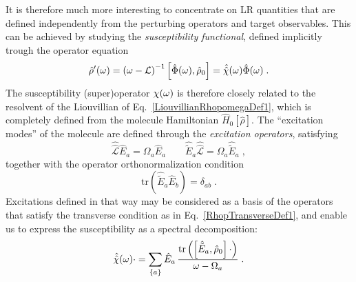 \documentclass[reprint,aps,prb]{revtex4-1}
\newcommand{\be}{\begin{equation}}
\newcommand{\ee}{\end{equation}}
\newcommand{\qq}{\qquad}
\newcommand{\lb}{\label}
\newcommand{\op}[1]{\hat {#1}}
\newcommand{\sop}[1]{\op{\op {#1}}}
\newcommand{\commutator}[2]{\left[ {#1} , {#2} \right]}
\newcommand{\trace}[1]{\mathrm{tr}\left(#1\right)}
\newcommand{\dmnot}{\op{\rho}_0}
\newcommand{\dm}{\op{\rho}}
\newcommand{\hnot}{\op{H}_0}
\newcommand{\Liouv}{\sop{\mathcal L}}
\begin{document}
It is therefore much more interesting to concentrate on LR quantities that are defined independently from the perturbing operators and target observables.
This can be achieved by studying the 
\emph{susceptibility functional}, defined implicitly trough the operator equation  
\be\lb{SusceptibilityDef1}
\dm'(\omega) = \left(\omega -\mathcal L \right)^{-1} \commutator{\op \Phi(\omega)}{\dmnot} = \sop{{\cal \chi}}(\omega) \op\Phi(\omega) \;. 
\ee
The susceptibility (super)operator $\cal \chi(\omega)$ is therefore closely related to the resolvent of the Liouvillian of Eq.~\eqref{LiouvillianRhopomegaDef1}, which is completely defined 
from the molecule Hamiltonian $\hnot[\dm]$.
The ``excitation modes''  of the molecule are defined through the \emph{excitation operators}, satisfying
\be\lb{ExcitationOperatorsDef1}
\Liouv \op E_a = \Omega_a \op E_a \qq \op{\tilde E}_a \Liouv = \Omega_a \op{\tilde E}_a \;,
\ee
together with the operator orthonormalization condition %
\be\lb{orthoExcitatioOpDef1}
\trace{\op{\tilde E}_a\op E_b} = \delta_{ab} \;.
\ee
Excitations defined in that way may be considered as a basis of the operators that satisfy the transverse condition as in  
Eq.~\eqref{RhopTransverseDef1}, and enable us to express the susceptibility as a spectral decomposition:
\be\lb{RhopExcitationDef1}
\sop{{\cal \chi}}(\omega) \cdot   = \sum_{\{a\}} \op E_{a} \,
\frac{\trace{\commutator{\op{\tilde E}_a}{\dmnot}\cdot}}{\omega-\Omega_a} \;.
\ee 
\end{document}
